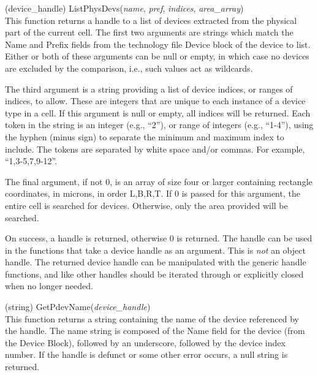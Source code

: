 \begin{description}
\item{(device\_handle) \vt ListPhysDevs({\it name}, {\it pref}, {\it indices},
  {\it area\_array\/})}\\
This function returns a handle to a list of devices extracted from the
physical part of the current cell.  The first two arguments are
strings which match the {\vt Name} and {\vt Prefix} fields from the
technology file Device block of the device to list.  Either or both of
these arguments can be null or empty, in which case no devices are
excluded by the comparison, i.e., such values act as wildcards.

The third argument is a string providing a list of device indices, or
ranges of indices, to allow.  These are integers that are unique to
each instance of a device type in a cell.  If this argument is null or
empty, all indices will be returned.  Each token in the string is an
integer (e.g., ``2''), or range of integers (e.g., ``1-4''), using the
hyphen (minus sign) to separate the minimum and maximum index to
include.  The tokens are separated by white space and/or commas.  For
example, ``1,3-5,7,9-12''.

The final argument, if not 0, is an array of size four or larger
containing rectangle coordinates, in microns, in order L,B,R,T.  If 0
is passed for this argument, the entire cell is searched for devices. 
Otherwise, only the area provided will be searched.

On success, a handle is returned, otherwise 0 is returned.  The handle
can be used in the functions that take a device handle as an argument. 
This is {\it not} an object handle.  The returned device handle can be
manipulated with the generic handle functions, and like other handles
should be iterated through or explicitly closed when no longer needed.

\item{(string) \vt GetPdevName({\it device\_handle\/})}\\
This function returns a string containing the name of the device
referenced by the handle.  The name string is composed of the {\vt
Name} field for the device (from the {\et Device Block}), followed by
an underscore, followed by the device index number.  If the handle is
defunct or some other error occurs, a null string is returned.


\end{description}
